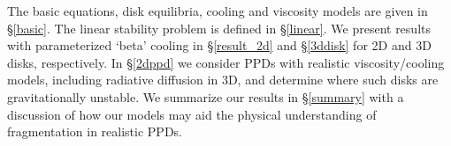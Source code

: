 \documentclass[iop, numberedappendix]{emulateapj}
\begin{document}
The basic equations, disk equilibria, cooling and viscosity models are 
given in \S\ref{basic}. The linear stability problem is defined in 
\S\ref{linear}. We present results with parameterized `beta' cooling in 
\S\ref{result_2d} and \S\ref{3ddisk} for 2D and 3D disks,
respectively. %
In \S\ref{2dppd} we consider PPDs with realistic viscosity/cooling   
models, including radiative diffusion in 3D, and determine where such
disks are gravitationally unstable. We summarize our results in
\S\ref{summary} with a discussion of how our models may aid the 
physical understanding of fragmentation in realistic PPDs.   





 




\appendix




\end{document}
